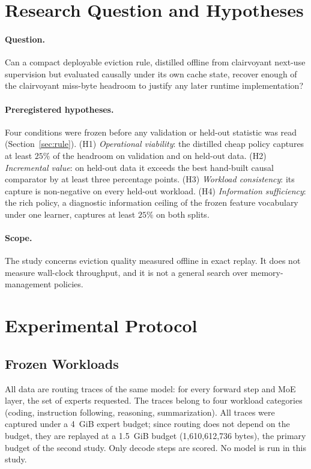 \documentclass[11pt]{article}
\theoremstyle{plain}
\theoremstyle{definition}
\begin{document}
\section{Research Question and Hypotheses}
\label{sec:question}

\paragraph{Question.} Can a compact deployable eviction rule, distilled offline from clairvoyant next-use supervision but evaluated causally under its own cache state, recover enough of the clairvoyant miss-byte headroom to justify any later runtime implementation?

\paragraph{Preregistered hypotheses.} Four conditions were frozen before any validation or held-out statistic was read (Section~\ref{sec:rule}). (H1) \emph{Operational viability}: the distilled cheap policy captures at least $25\%$ of the headroom on validation and on held-out data. (H2) \emph{Incremental value}: on held-out data it exceeds the best hand-built causal comparator by at least three percentage points. (H3) \emph{Workload consistency}: its capture is non-negative on every held-out workload. (H4) \emph{Information sufficiency}: the rich policy, a diagnostic information ceiling of the frozen feature vocabulary under one learner, captures at least $25\%$ on both splits.

\paragraph{Scope.} The study concerns eviction quality measured offline in exact replay. It does not measure wall-clock throughput, and it is not a general search over memory-management policies.

\section{Experimental Protocol}
\label{sec:protocol}

\subsection{Frozen Workloads}
\label{sec:workloads}
All data are routing traces of the same model: for every forward step and MoE layer, the set of experts requested. The traces belong to four workload categories (coding, instruction following, reasoning, summarization). All traces were captured under a 4~GiB expert budget; since routing does not depend on the budget, they are replayed at a 1.5~GiB budget (1{,}610{,}612{,}736 bytes), the primary budget of the second study. Only decode steps are scored. No model is run in this study.
\end{document}
